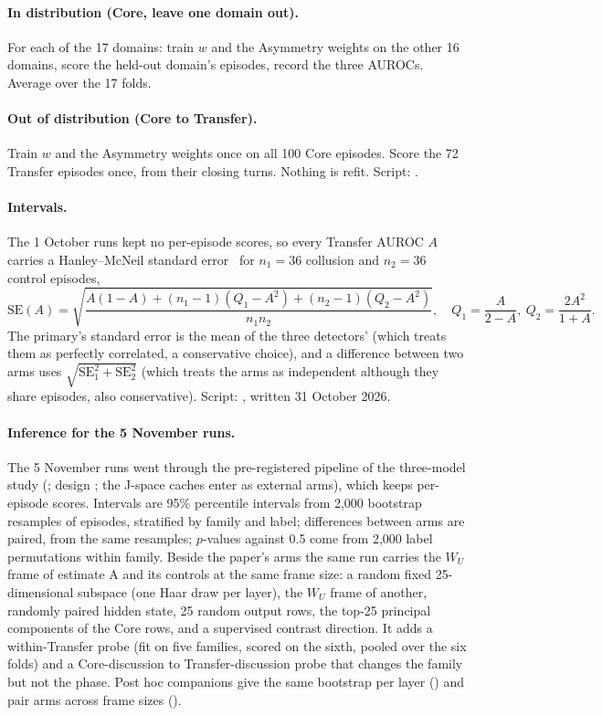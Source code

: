 \documentclass[11pt,a4paper]{article}
\newcommand{\WU}{W_U}
\begin{document}
\paragraph{In distribution (Core, leave one domain out).} For each of the 17 domains: train $w$ and the Asymmetry weights on the other 16 domains, score the held-out domain's episodes, record the three AUROCs. Average over the 17 folds.

\paragraph{Out of distribution (Core to Transfer).} Train $w$ and the Asymmetry weights once on all 100 Core episodes. Score the 72 Transfer episodes once, from their closing turns. Nothing is refit. Script: .

\paragraph{Intervals.} The 1 October runs kept no per-episode scores, so every Transfer AUROC $A$ carries a Hanley--McNeil standard error~\citep{hanley1982meaning} for $n_1=36$ collusion and $n_2=36$ control episodes,
\begin{equation}
\mathrm{SE}(A)=\sqrt{\frac{A(1-A)+(n_1-1)(Q_1-A^2)+(n_2-1)(Q_2-A^2)}{n_1 n_2}},\quad Q_1=\frac{A}{2-A},\ Q_2=\frac{2A^2}{1+A}.
\end{equation}
The primary's standard error is the mean of the three detectors' (which treats them as perfectly correlated, a conservative choice), and a difference between two arms uses $\sqrt{\mathrm{SE}_1^2+\mathrm{SE}_2^2}$ (which treats the arms as independent although they share episodes, also conservative). Script: , written 31 October 2026.

\paragraph{Inference for the 5 November runs.} The 5 November runs went through the pre-registered pipeline of the three-model study (; design ; the J-space caches enter as external arms), which keeps per-episode scores. Intervals are 95\% percentile intervals from 2,000 bootstrap resamples of episodes, stratified by family and label; differences between arms are paired, from the same resamples; $p$-values against 0.5 come from 2,000 label permutations within family. Beside the paper's arms the same run carries the $\WU$ frame of estimate A and its controls at the same frame size: a random fixed 25-dimensional subspace (one Haar draw per layer), the $\WU$ frame of another, randomly paired hidden state, 25 random output rows, the top-25 principal components of the Core rows, and a supervised contrast direction. It adds a within-Transfer probe (fit on five families, scored on the sixth, pooled over the six folds) and a Core-discussion to Transfer-discussion probe that changes the family but not the phase. Post hoc companions give the same bootstrap per layer () and pair arms across frame sizes ().
\end{document}
